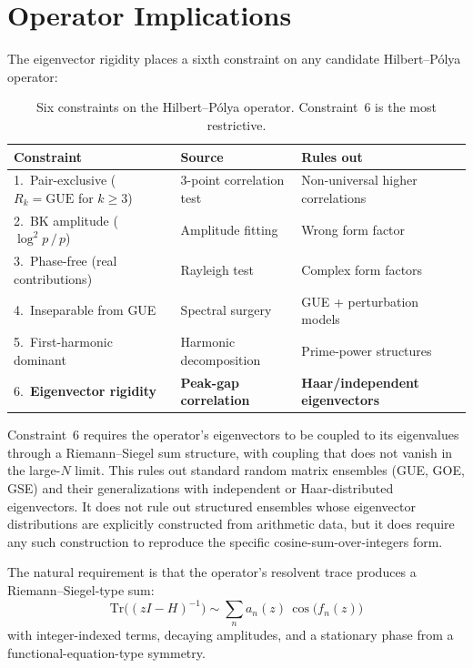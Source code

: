 \documentclass[11pt,a4paper]{article}
\begin{document}
\section{Operator Implications}

The eigenvector rigidity places a sixth constraint on any candidate Hilbert--P\'olya operator:

\begin{table}[ht]
\centering
\small
\begin{tabular}{@{}p{5.5cm}p{3.5cm}p{4.5cm}@{}}
\toprule
Constraint & Source & Rules out \\
\midrule
1.\ Pair-exclusive ($R_k = \text{GUE}$ for $k \ge 3$) & 3-point correlation test & Non-universal higher correlations \\
2.\ BK amplitude ($\log^2 p\,/\,p$) & Amplitude fitting & Wrong form factor \\
3.\ Phase-free (real contributions) & Rayleigh test & Complex form factors \\
4.\ Inseparable from GUE & Spectral surgery & GUE + perturbation models \\
5.\ First-harmonic dominant & Harmonic decomposition & Prime-power structures \\
6.\ \textbf{Eigenvector rigidity} & \textbf{Peak-gap correlation} & \textbf{Haar/independent eigenvectors} \\
\bottomrule
\end{tabular}
\caption{Six constraints on the Hilbert--P\'olya operator. Constraint~6 is the most restrictive.}
\label{tab:constraints}
\end{table}

Constraint~6 requires the operator's eigenvectors to be coupled to its eigenvalues through a Riemann--Siegel sum structure, with coupling that does not vanish in the large-$N$ limit.
This rules out standard random matrix ensembles (GUE, GOE, GSE) and their generalizations with independent or Haar-distributed eigenvectors.
It does not rule out structured ensembles whose eigenvector distributions are explicitly constructed from arithmetic data, but it does require any such construction to reproduce the specific cosine-sum-over-integers form.

The natural requirement is that the operator's resolvent trace produces a Riemann--Siegel-type sum:
\begin{equation}\label{eq:resolvent}
\mathrm{Tr}\bigl((zI - H)^{-1}\bigr) \sim \sum_n a_n(z)\,\cos\!\bigl(f_n(z)\bigr)
\end{equation}
with integer-indexed terms, decaying amplitudes, and a stationary phase from a functional-equation-type symmetry.
\end{document}
